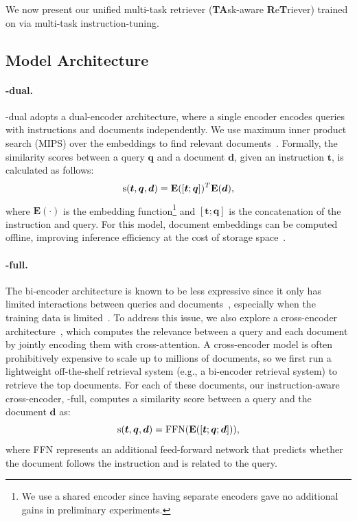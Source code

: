\label{sec:method}
{
We now present our unified multi-task retriever \model ({\bf TA}sk-aware {\bf R}e{\bf T}riever) trained on \rib via multi-task instruction-tuning. 
}


\subsection{Model Architecture}
\label{sec:model_architecture}

\paragraph{\model-dual.}
{
\model-dual adopts a dual-encoder architecture, where a single encoder encodes queries with instructions and documents independently. 
We use maximum inner product search (MIPS) over the embeddings to find relevant documents~\cite{karpukhin-etal-2020-dense}. 
}
Formally, the similarity scores between a query $\boldsymbol{q}$ and a document $\boldsymbol{d}$, given an instruction $\boldsymbol{t}$, is calculated as follows:
\begin{equation}\label{eq:bi_enc_sim}
    {\rm s}(\boldsymbol{t}, \boldsymbol{q}, \boldsymbol{d}) = \mathbf{E}([\boldsymbol{t};\boldsymbol{q}])^T\mathbf{E}(\boldsymbol{d}),
\end{equation}
where $\mathbf{E}(\cdot)$ is the embedding function\footnote{We use a shared encoder since having separate encoders gave no additional gains in preliminary experiments.} and $[\boldsymbol{t};\boldsymbol{q}]$ is the concatenation of the instruction and query. 
For this model, document embeddings can be computed offline, improving inference efficiency at the cost of storage space~\cite{yamada-etal-2021-efficient}.

\paragraph{\model-full.}
The bi-encoder architecture is known to be less expressive since it only has limited interactions between queries and documents~\cite{colbert}, especially when the training data is limited~\cite{hofstatter2021efficiently}. 
{
To address this issue, we also explore a cross-encoder architecture~\cite{nogueira2019passage}, which computes the relevance between a query and each document by jointly encoding them with cross-attention. 
A cross-encoder model is often prohibitively expensive to scale up to millions of documents, so we first run a lightweight off-the-shelf retrieval system (e.g., a bi-encoder retrieval system) to retrieve the top documents. 
For each of these documents, our instruction-aware cross-encoder, \model-full, computes a similarity score between a query and the document $\boldsymbol{d}$ as:
}
\begin{equation}
\label{eq:ce_score}
    {\rm s}(\boldsymbol{t}, \boldsymbol{q}, \boldsymbol{d}) ={\rm FFN}(\mathbf{E}([\boldsymbol{t}; \boldsymbol{q}; \boldsymbol{d}])),
\end{equation}
where {\rm FFN} represents an additional feed-forward network that predicts whether the document follows the instruction and is related to the query. 

